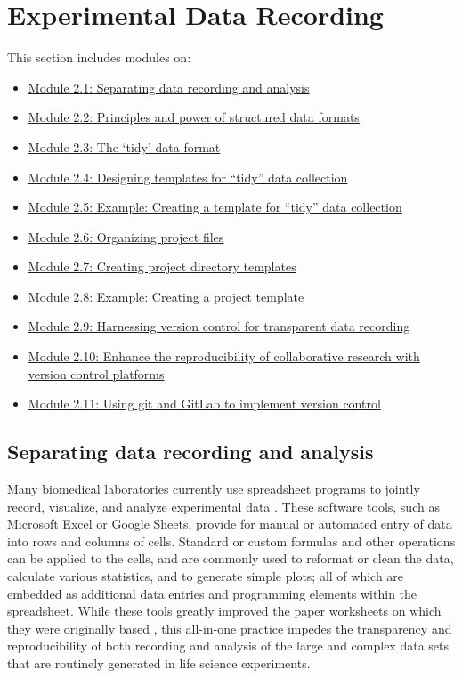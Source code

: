 \documentclass[]{tufte-book}
\providecommand{\tightlist}{%
  \setlength{\itemsep}{0pt}\setlength{\parskip}{0pt}}
\begin{document}
\chapter{Experimental Data Recording}\label{experimental-data-recording}

This section includes modules on:

\begin{itemize}
\tightlist
\item
  \hyperref[module1]{Module 2.1: Separating data recording and analysis}
\item
  \hyperref[module2]{Module 2.2: Principles and power of structured data formats}
\item
  \hyperref[module3]{Module 2.3: The `tidy' data format}
\item
  \hyperref[module4]{Module 2.4: Designing templates for ``tidy'' data collection}
\item
  \hyperref[module5]{Module 2.5: Example: Creating a template for ``tidy'' data collection}
\item
  \hyperref[module6]{Module 2.6: Organizing project files}
\item
  \hyperref[module7]{Module 2.7: Creating project directory templates}
\item
  \hyperref[module8]{Module 2.8: Example: Creating a project template}
\item
  \hyperref[module9]{Module 2.9: Harnessing version control for transparent data recording}
\item
  \hyperref[module10]{Module 2.10: Enhance the reproducibility of collaborative research with version control platforms}
\item
  \hyperref[module11]{Module 2.11: Using git and GitLab to implement version control}
\end{itemize}

\section{Separating data recording and analysis}\label{module1}

Many biomedical laboratories currently use spreadsheet programs to jointly
record, visualize, and analyze experimental data \citep{broman2018data}. These
software tools, such as Microsoft Excel or Google Sheets, provide for manual or
automated entry of data into rows and columns of cells. Standard or custom
formulas and other operations can be applied to the cells, and are commonly used
to reformat or clean the data, calculate various statistics, and to generate
simple plots; all of which are embedded as additional data entries and
programming elements within the spreadsheet. While these tools greatly improved
the paper worksheets on which they were originally based \citep{campbell2007number},
this all-in-one practice impedes the transparency and reproducibility of both
recording and analysis of the large and complex data sets that are routinely
generated in life science experiments.
\end{document}
